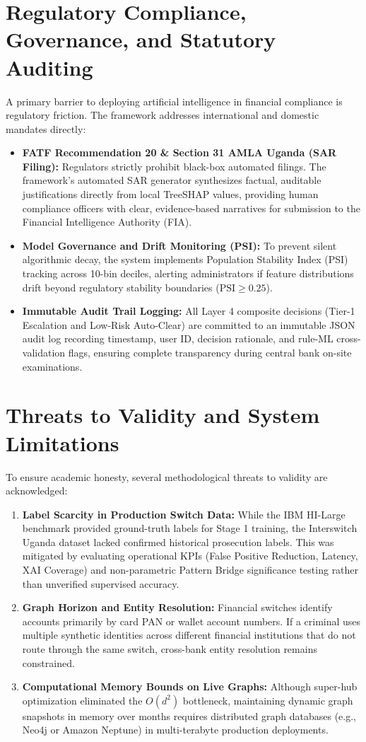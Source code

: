 \section{Regulatory Compliance, Governance, and Statutory Auditing}
A primary barrier to deploying artificial intelligence in financial compliance is regulatory friction. The framework addresses international and domestic mandates directly:
\begin{itemize}
    \item \textbf{FATF Recommendation 20 \& Section 31 AMLA Uganda (SAR Filing):} Regulators strictly prohibit black-box automated filings. The framework's automated SAR generator synthesizes factual, auditable justifications directly from local TreeSHAP values, providing human compliance officers with clear, evidence-based narratives for submission to the Financial Intelligence Authority (FIA).
    \item \textbf{Model Governance and Drift Monitoring (PSI):} To prevent silent algorithmic decay, the system implements Population Stability Index (PSI) tracking across 10-bin deciles, alerting administrators if feature distributions drift beyond regulatory stability boundaries ($\text{PSI} \ge 0.25$).
    \item \textbf{Immutable Audit Trail Logging:} All Layer 4 composite decisions (Tier-1 Escalation and Low-Risk Auto-Clear) are committed to an immutable JSON audit log recording timestamp, user ID, decision rationale, and rule-ML cross-validation flags, ensuring complete transparency during central bank on-site examinations.
\end{itemize}

\section{Threats to Validity and System Limitations}
To ensure academic honesty, several methodological threats to validity are acknowledged:
\begin{enumerate}
    \item \textbf{Label Scarcity in Production Switch Data:} While the IBM HI-Large benchmark provided ground-truth labels for Stage 1 training, the Interswitch Uganda dataset lacked confirmed historical prosecution labels. This was mitigated by evaluating operational KPIs (False Positive Reduction, Latency, XAI Coverage) and non-parametric Pattern Bridge significance testing rather than unverified supervised accuracy.
    \item \textbf{Graph Horizon and Entity Resolution:} Financial switches identify accounts primarily by card PAN or wallet account numbers. If a criminal uses multiple synthetic identities across different financial institutions that do not route through the same switch, cross-bank entity resolution remains constrained.
    \item \textbf{Computational Memory Bounds on Live Graphs:} Although super-hub optimization eliminated the $O(d^2)$ bottleneck, maintaining dynamic graph snapshots in memory over months requires distributed graph databases (e.g., Neo4j or Amazon Neptune) in multi-terabyte production deployments.
\end{enumerate}

